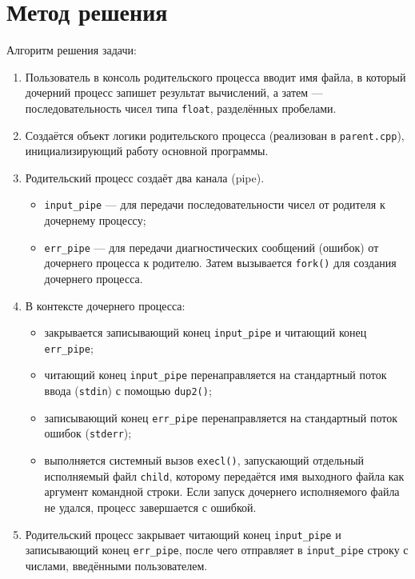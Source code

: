 \section{Метод решения}

Алгоритм решения задачи:

\begin{enumerate}
\item Пользователь в консоль родительского процесса вводит имя файла, в который дочерний процесс запишет результат вычислений, а затем — последовательность чисел типа \texttt{float}, разделённых пробелами.

\item Создаётся объект логики родительского процесса (реализован в \texttt{parent.cpp}), инициализирующий работу основной программы.

\item Родительский процесс создаёт два канала (pipe).
    \begin{itemize}
    \item \texttt{input\_pipe} — для передачи последовательности чисел от родителя к дочернему процессу;
    \item \texttt{err\_pipe} — для передачи диагностических сообщений (ошибок) от дочернего процесса к родителю.
    Затем вызывается \texttt{fork()} для создания дочернего процесса.
    \end{itemize}
\item В контексте дочернего процесса:
    \begin{itemize}
    \item закрывается записывающий конец \texttt{input\_pipe} и читающий конец \texttt{err\_pipe};
    \item читающий конец \texttt{input\_pipe} перенаправляется на стандартный поток ввода (\texttt{stdin}) с помощью \texttt{dup2()};
    \item записывающий конец \texttt{err\_pipe} перенаправляется на стандартный поток ошибок (\texttt{stderr});
    \item выполняется системный вызов \texttt{execl()}, запускающий отдельный исполняемый файл \texttt{child}, которому передаётся имя выходного файла как аргумент командной строки.
    Если запуск дочернего исполняемого файла не удался, процесс завершается с ошибкой.
    \end{itemize}

\item Родительский процесс закрывает читающий конец \texttt{input\_pipe} и записывающий конец \texttt{err\_pipe}, после чего отправляет в \texttt{input\_pipe} строку с числами, введёнными пользователем.


\end{enumerate}

